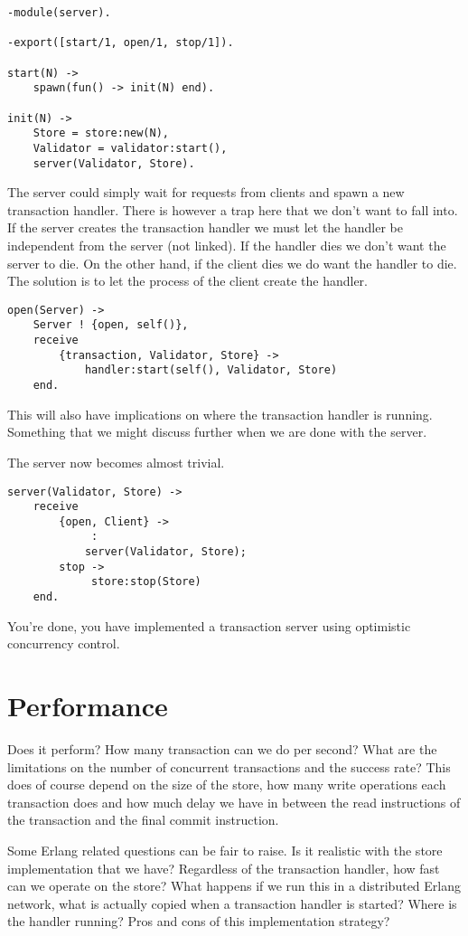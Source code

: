 \documentclass[a4paper, 11pt]{article}
\begin{document}
\begin{verbatim}
-module(server).

-export([start/1, open/1, stop/1]).

start(N) ->
    spawn(fun() -> init(N) end).

init(N) ->
    Store = store:new(N),
    Validator = validator:start(),
    server(Validator, Store).
\end{verbatim}

The server could simply wait for requests from clients and spawn a new
transaction handler. There is however a trap here that we don't want
to fall into. If the server creates the transaction handler we must
let the handler be independent from the server (not linked). If the
handler dies we don't want the server to die. On the other hand, if
the client dies we do want the handler to die. The solution is to let
the process of the client create the handler.

\begin{verbatim}
open(Server) ->
    Server ! {open, self()},
    receive
        {transaction, Validator, Store} ->
            handler:start(self(), Validator, Store)
    end.
\end{verbatim}

\noindent This will also have implications on where the transaction
handler is running. Something that we might discuss further when we
are done with the server.

The server now becomes almost trivial.

\begin{verbatim}
server(Validator, Store) ->
    receive 
        {open, Client} ->
             :
            server(Validator, Store);
        stop ->
             store:stop(Store)
    end.
\end{verbatim}

You're done, you have implemented a transaction server using
optimistic concurrency control.

\section{Performance}



Does it perform? How many transaction can we do per second? What are
the limitations on the number of concurrent transactions and the
success rate? This does of course depend on the size of the store, how
many write operations each transaction does and how much delay we have
in between the read instructions of the transaction and the final commit
instruction.

Some Erlang related questions can be fair to raise. Is it realistic
with the store implementation that we have? Regardless of the
transaction handler, how fast can we operate on the store? What
happens if we run this in a distributed Erlang network, what is
actually copied when a transaction handler is started? Where is the
handler running? Pros and cons of this implementation strategy?
\end{document}

